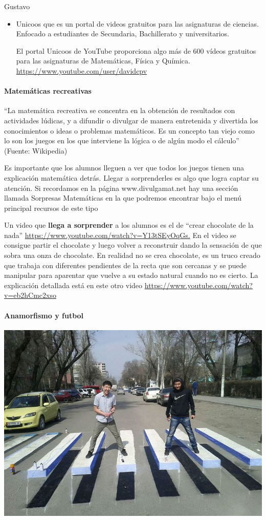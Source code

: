 \begin{opin}{\guscolor}{Gustavo}
\begin{itemize}
\item Unicoos que es un portal de videos gratuitos para las asignaturas de ciencias. Enfocado a estudiantes de Secundaria, Bachillerato y universitarios.  

El portal Unicoos de YouTube proporciona algo más de 600 vídeos gratuitos para las asignaturas de Matemáticas, Física y Química. \url{https://www.youtube.com/user/davidcpv}
\end{itemize}

\paragraph{Matemáticas recreativas}
“La matemática recreativa se concentra en la obtención de resultados con actividades lúdicas, y a difundir o divulgar de manera entretenida y divertida los conocimientos o ideas o problemas matemáticos. Es un concepto tan viejo como lo son los juegos en los que interviene la lógica o de algún modo el cálculo” (Fuente: Wikipedia)

Es importante que los alumnos lleguen a ver que todos los juegos tienen una explicación matemática detrás. Llegar a sorprenderles es algo que logra captar su atención. Si recordamos en la página www.divulgamat.net hay una sección llamada Sorpresas Matemáticas en la que podremos encontrar bajo el menú principal recursos de este tipo


 
Un video que \textbf{llega a sorprender} a los alumnos es el de “crear chocolate de la nada” \url{https://www.youtube.com/watch?v=Y13tSEyOqGs.} En el video se consigue partir el chocolate y luego volver a reconstruir dando la sensación de que sobra una onza de chocolate. En realidad no se crea chocolate, es un truco creado que trabaja con diferentes pendientes de la recta que son cercanas y se puede manipular para aparentar que vuelve a su estado natural cuando no es cierto. La explicación detallada está en este otro video \url{https://www.youtube.com/watch?v=eb2hCmc2xso}

 

\paragraph{Anamorfismo y futbol\\}
 

\begin{minipage}[h]{1\linewidth}
	\centering
	\includegraphics[width=0.7\linewidth]{img/anamorf1.jpg}
\end{minipage}
 

\end{opin}
